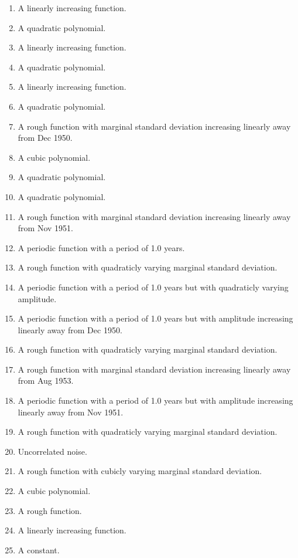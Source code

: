 \documentclass[11pt,a4paper]{article}
\begin{document}
\begin{enumerate}
  \item A linearly increasing function.
  \item A quadratic polynomial.
  \item A linearly increasing function.
  \item A quadratic polynomial.
  \item A linearly increasing function.
  \item A quadratic polynomial.
  \item A rough function with marginal standard deviation increasing linearly away from Dec 1950.
  \item A cubic polynomial.
  \item A quadratic polynomial.
  \item A quadratic polynomial.
  \item A rough function with marginal standard deviation increasing linearly away from Nov 1951.
  \item A periodic function with a period of 1.0 years.
  \item A rough function with quadraticly varying marginal standard deviation.
  \item A periodic function with a period of 1.0 years but with quadraticly varying amplitude.
  \item A periodic function with a period of 1.0 years but with amplitude increasing linearly away from Dec 1950.
  \item A rough function with quadraticly varying marginal standard deviation.
  \item A rough function with marginal standard deviation increasing linearly away from Aug 1953.
  \item A periodic function with a period of 1.0 years but with amplitude increasing linearly away from Nov 1951.
  \item A rough function with quadraticly varying marginal standard deviation.
  \item Uncorrelated noise.
  \item A rough function with cubicly varying marginal standard deviation.
  \item A cubic polynomial.
  \item A rough function.
  \item A linearly increasing function.
  \item A constant.
\end{enumerate}
\end{document}
